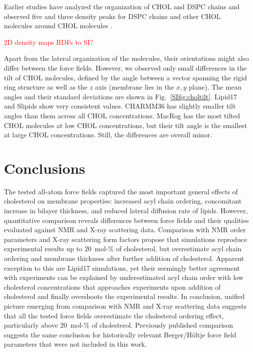 \documentclass[journal=jctcce]{achemso}
\begin{document}
Earlier studies have analyzed the organization of CHOL and DSPC chains and observed five and three density peaks for DSPC chains and other CHOL molecules around CHOL molecules \cite{martinez2010cholesterol}. 

\textcolor{red}{2D density maps}
\textcolor{red}{RDFs to SI?}

Apart from the lateral organization of the molecules, their orientations might also differ between the force fields. However, we observed only small differences in the tilt of CHOL molecules, defined by the angle between a vector spanning the rigid ring structure as well as the $z$ axis (membrane lies in the $x,y$ plane). The mean angles and their standard deviations are shown in Fig.~\ref{SIfig:choltilt}. Lipid17 and Slipids show very consistent values. CHARMM36 has slightly smaller tilt angles than them across all CHOL concentrations. MacRog has the most tilted CHOL molecules at low CHOL concentrations, but their tilt angle is the smallest at large CHOL concentrations. Still, the differences are overall minor.

\section{Conclusions}

The tested all-atom force fields captured the most important general effects of cholesterol on membrane properties: increased acyl chain ordering, concomitant increase in bilayer thickness, and reduced lateral diffusion rate of lipids. However, quantitative comparison reveals differences between force fields and their qualities evaluated against NMR and X-ray scattering data. Comparison with NMR order parameters and X-ray scattering form factors propose that simulations reproduce experimental results up to 20~mol-\% of cholesterol, but overestimate acyl chain ordering and membrane thickness after further addition of cholesterol. Apparent exception to this are Lipid17 simulations, yet their seemingly better agreement with experiments can be explained by underestimated acyl chain order with low cholesterol concentrations that approaches experiments upon addition of cholesterol and finally overshoots the experimental results. In conclusion, unified picture emerging from comparison with NMR and X-ray scattering data suggests that all the tested force fields overestimate the cholesterol ordering effect, particularly above 20~mol-\% of cholesterol. Previously published comparison~\cite{ferreira13} suggests the same conclusion for historically relevant Berger/H{\"o}ltje force field parameters that were not included in this work.
\end{document}
